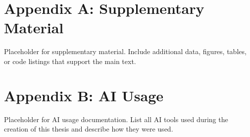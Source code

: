 \chapter{Appendix A: Supplementary Material}
Placeholder for supplementary material. Include additional data, figures, tables, or code listings that support the main text.

\chapter{Appendix B: AI Usage}
Placeholder for AI usage documentation. List all AI tools used during the creation of this thesis and describe how they were used.
